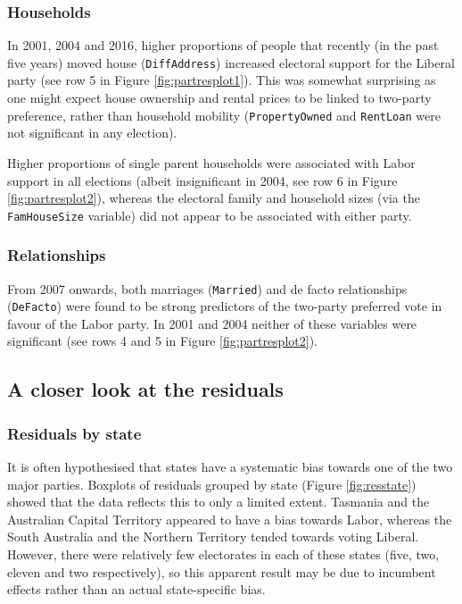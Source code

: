 \documentclass[
  times, doublespace]{anzsauth}
\begin{document}
\hypertarget{households}{%
\subsubsection*{Households}\label{households}}

In 2001, 2004 and 2016, higher proportions of people that recently (in the past five years) moved house (\texttt{DiffAddress}) increased electoral support for the Liberal party (see row 5 in Figure \ref{fig:partresplot1}). This was somewhat surprising as one might expect house ownership and rental prices to be linked to two-party preference, rather than household mobility (\texttt{PropertyOwned} and \texttt{RentLoan} were not significant in any election).

Higher proportions of single parent households were associated with Labor support in all elections (albeit insignificant in 2004, see row 6 in Figure \ref{fig:partresplot2}), whereas the electoral family and household sizes (via the \texttt{FamHouseSize} variable) did not appear to be associated with either party.

\hypertarget{relationships}{%
\subsubsection*{Relationships}\label{relationships}}

From 2007 onwards, both marriages (\texttt{Married}) and de facto relationships (\texttt{DeFacto}) were found to be strong predictors of the two-party preferred vote in favour of the Labor party. In 2001 and 2004 neither of these variables were significant (see rows 4 and 5 in Figure \ref{fig:partresplot2}).

\hypertarget{a-closer-look-at-the-residuals}{%
\subsection{A closer look at the residuals}\label{a-closer-look-at-the-residuals}}

\hypertarget{residuals-by-state}{%
\subsubsection*{Residuals by state}\label{residuals-by-state}}

It is often hypothesised that states have a systematic bias towards one of the two major parties. Boxplots of residuals grouped by state (Figure \ref{fig:resstate}) showed that the data reflects this to only a limited extent. Tasmania and the Australian Capital Territory appeared to have a bias towards Labor, whereas the South Australia and the Northern Territory tended towards voting Liberal. However, there were relatively few electorates in each of these states (five, two, eleven and two respectively), so this apparent result may be due to incumbent effects rather than an actual state-specific bias.
\end{document}
